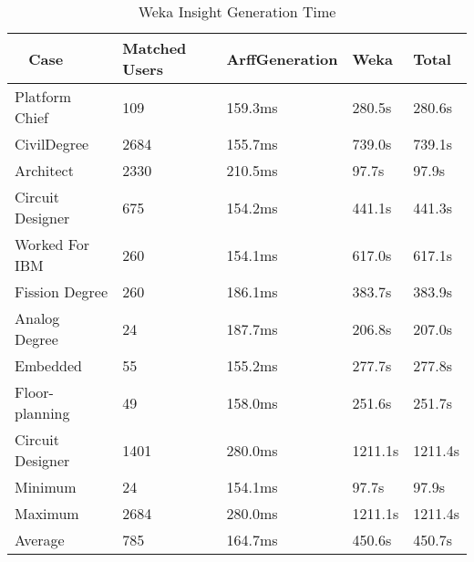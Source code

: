  \begin{table}[H]
  \centering
  \begin{tabular}{|p{17mm}|p{16mm}|p{18mm}|p{19mm}|p{20mm}|}
  \hline
  \
  Case&Matched Users&Arff\newline Generation&Weka&Total\\
  \hline\hline
  Platform Chief&109&159.3ms&280.5s&280.6s\\ \hline
  Civil\newline Degree&2684&155.7ms&739.0s&739.1s\\ \hline 
  Architect&2330&210.5ms&97.7s&97.9s\\ \hline
  Circuit Designer&675&154.2ms&441.1s&441.3s\\ \hline
  Worked For IBM&260&154.1ms&617.0s&617.1s\\ \hline
  Fission Degree&260&186.1ms&383.7s&383.9s\\ \hline
  Analog Degree&24&187.7ms&206.8s&207.0s\\ \hline
  Embedded&55&155.2ms&277.7s&277.8s\\ \hline
  Floor- \newline planning&49&158.0ms&251.6s&251.7s\\ \hline
  Circuit Designer&1401&280.0ms&1211.1s&1211.4s\\ \hline
  \hline\hline
  Minimum&24&154.1ms&97.7s&97.9s\\ \hline
  Maximum&2684&280.0ms&1211.1s&1211.4s\\ \hline
  Average&785&164.7ms&450.6s&450.7s\\ \hline
  \end{tabular}
  \caption{Weka Insight Generation Time}
  \label{tab:weka-perf}
\end{table}
